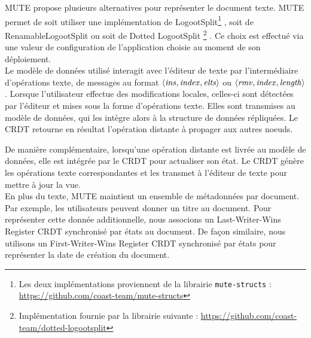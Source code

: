 \label{sec:mute-crdts}

MUTE propose plusieurs alternatives pour représenter le document texte.
MUTE permet de soit utiliser une implémentation de LogootSplit\footnote{Les deux implémentations proviennent de la librairie \texttt{mute-structs} : \url{https://github.com/coast-team/mute-structs}} , soit de RenamableLogootSplit\footnotemark[\value{footnote}]  ou soit de Dotted LogootSplit \footnote{Implémentation fournie par la librairie suivante : \url{https://github.com/coast-team/dotted-logootsplit}} \cite{2021-these-vic}.
Ce choix est effectué via une valeur de configuration de l'application choisie au moment de son déploiement.\\

Le modèle de données utilisé interagit avec l'éditeur de texte par l'intermédiaire d'opérations texte, \ie de messages au format $\langle \mathit{ins}, \mathit{index},\mathit{elts} \rangle$ ou $\langle \mathit{rmv}, \mathit{index}, \mathit{length} \rangle$.
Lorsque l'utilisateur effectue des modifications locales, celles-ci sont détectées par l'éditeur et mises sous la forme d'opérations texte.
Elles sont transmises au modèle de données, qui les intègre alors à la structure de données répliquées.
Le \ac{CRDT} retourne en résultat l'opération distante à propager aux autres noeuds.

De manière complémentaire, lorsqu'une opération distante est livrée au modèle de données, elle est intégrée par le \ac{CRDT} pour actualiser son état.
Le \ac{CRDT} génère les opérations texte correspondantes et les transmet à l'éditeur de texte pour mettre à jour la vue.\\

En plus du texte, MUTE maintient un ensemble de métadonnées par document.
Par exemple, les utilisateurs peuvent donner un titre au document.
Pour représenter cette donnée additionnelle, nous associons un Last-Writer-Wins Register \ac{CRDT} synchronisé par états \cite{shapiro_2011_crdt} au document.
De façon similaire, nous utilisons un First-Writer-Wins Register \ac{CRDT} synchronisé par états pour représenter la date de création du document.


